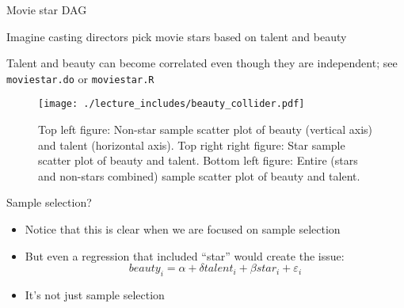 \documentclass{beamer}
\begin{document}
\begin{frame}{Movie star DAG}

Imagine casting directors pick movie stars based on talent and beauty

  \begin{center}
  \end{center}

Talent and beauty can become correlated even though they are independent; see \texttt{moviestar.do} or \texttt{moviestar.R}


\end{frame}

\begin{frame}[shrink=20,plain]

  \begin{figure}
    \texttt{[image: ./lecture\_includes/beauty\_collider.pdf]}
    \caption{Top left figure: Non-star sample scatter plot of beauty (vertical axis) and talent (horizontal axis). Top right right figure: Star sample scatter plot of beauty and talent.  Bottom left figure: Entire (stars and non-stars combined) sample scatter plot of beauty and talent.}
  \end{figure}
\end{frame}

\begin{frame}{Sample selection?}

\begin{itemize}
\item Notice that this is clear when we are focused on sample selection
\item But even a regression that included ``star'' would create the issue:$$beauty_i = \alpha + \delta talent_i + \beta star_i + \varepsilon_i$$
\item It's not just sample selection 
\end{itemize}

\end{frame}
\end{document}
